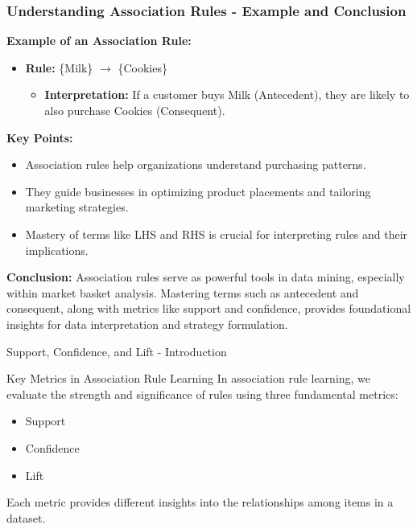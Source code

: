 \documentclass[aspectratio=169]{beamer}
\begin{document}
\begin{frame}[fragile]
    \frametitle{Understanding Association Rules - Example and Conclusion}
    
    \textbf{Example of an Association Rule:}
    \begin{itemize}
        \item \textbf{Rule:} \{Milk\} $\rightarrow$ \{Cookies\}
        \begin{itemize}
            \item \textbf{Interpretation:} If a customer buys Milk (Antecedent), they are likely to also purchase Cookies (Consequent).
        \end{itemize}
    \end{itemize}

    \textbf{Key Points:}
    \begin{itemize}
        \item Association rules help organizations understand purchasing patterns.
        \item They guide businesses in optimizing product placements and tailoring marketing strategies.
        \item Mastery of terms like LHS and RHS is crucial for interpreting rules and their implications.
    \end{itemize}

    \textbf{Conclusion:}
    Association rules serve as powerful tools in data mining, especially within market basket analysis. 
    Mastering terms such as antecedent and consequent, along with metrics like support and confidence, provides foundational insights for data interpretation and strategy formulation. 
\end{frame}

\begin{frame}[fragile]{Support, Confidence, and Lift - Introduction}
    \begin{block}{Key Metrics in Association Rule Learning}
        In association rule learning, we evaluate the strength and significance of rules using three fundamental metrics:
        \begin{itemize}
            \item Support
            \item Confidence
            \item Lift
        \end{itemize}
        Each metric provides different insights into the relationships among items in a dataset.
    \end{block}
\end{frame}
\end{document}
